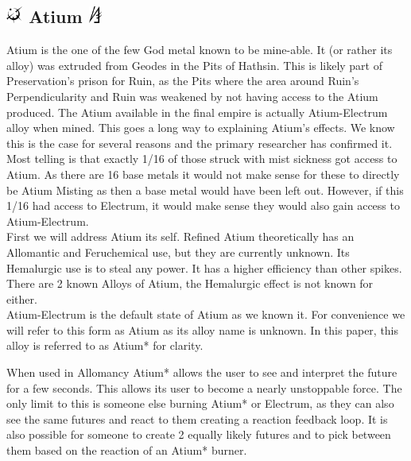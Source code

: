 \documentclass[conference]{IEEEtran}
\begin{document}
\subsection*{\includegraphics[height=1em]{images/Atium.png}  Atium \includegraphics[height=1em]{images/Atium_(Feruchemy).png}}
Atium is the one of the few God metal known to be mine-able.  It (or rather its alloy) was extruded from Geodes in the Pits of Hathsin.  This is likely part of Preservation's prison for Ruin, as the Pits where the area around Ruin's Perpendicularity and Ruin was weakened by not having access to the Atium produced.  
The Atium available in the final empire is actually Atium-Electrum alloy when mined.  This goes a long way to explaining Atium's effects.  We know this is the case for several reasons and the primary researcher has confirmed it.  Most telling is that exactly 1/16 of those struck with mist sickness got access to Atium.  As there are 16 base metals it would not make sense for these to directly be Atium Misting as then a base metal would have been left out.  However, if this 1/16 had access to Electrum, it would make sense they would also gain access to Atium-Electrum.\\

First we will address Atium its self.  Refined Atium theoretically has an Allomantic and Feruchemical use, but they are currently unknown.  Its Hemalurgic use is to steal any power.  It has a higher efficiency than other spikes.\\

There are 2 known Alloys of Atium, the Hemalurgic effect is not known for either.\\

Atium-Electrum is the default state of Atium as we known it.  For convenience we will refer to this form as Atium as its alloy name is unknown.  In this paper, this alloy is referred to as Atium* for clarity.

When used in Allomancy Atium* allows the user to see and interpret the future for a few seconds.  This allows its user to become a nearly unstoppable force.  The only limit to this is someone else burning Atium* or Electrum, as they can also see the same futures and react to them creating a reaction feedback loop.  It is also possible for someone to create 2 equally likely futures and to pick between them based on the reaction of an Atium* burner.\\
\end{document}
